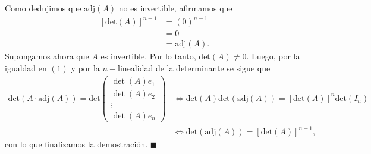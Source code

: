 \documentclass[11pt]{scrartcl}
\begin{document}
Como dedujimos que $\text{adj}(A)$ no es invertible, afirmamos que
\begin{align*}
    \left[\text{det}(A)\right]^{n-1} &= (0)^{n-1} \\
    &= 0 \\
    &= \text{adj}(A).
\end{align*}
Supongamos ahora que $A$ es invertible. Por lo tanto, det$(A)\neq 0$. Luego, por la igualdad en $(1)$ y por la $n-$linealidad de la determinante se sigue que
\begin{align*}
    \text{det}\left(A\cdot \text{adj}(A)\right)=\text{det}
    \begin{pmatrix}
        \det(A)e_1 \\
        \det(A)e_2 \\
        \vdots \\
        \det(A)e_n
    \end{pmatrix} &\iff 
    \text{det}\left(A\right)\text{det}\left(\text{adj}(A)\right)=\left[\text{det}(A)\right]^n\text{det}\left(I_n\right) \\
    &\iff \text{det}\left(\text{adj}(A)\right)=\left[\text{det}\left(A\right)\right]^{n-1},
\end{align*}
con lo que finalizamos la demostración. \hfill $\blacksquare$
\end{document}
